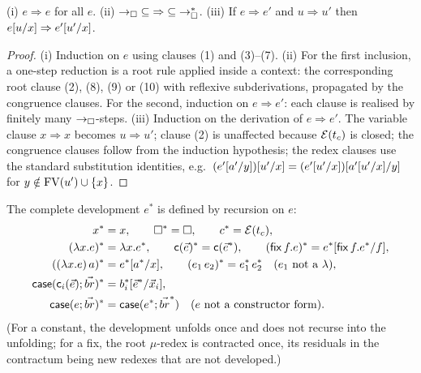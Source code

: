 \begin{lemma}
\label{lem:parred-basic}
(i) $e \Rightarrow e$ for all $e$.\quad
(ii) $\rightarrow_{\square}\; \subseteq\; \Rightarrow\; \subseteq\; \rightarrow_{\square}^{*}$.\quad
(iii) If $e \Rightarrow e'$ and $u \Rightarrow u'$ then
$e[u/x] \Rightarrow e'[u'/x]$.
\end{lemma}

\begin{proof}
(i) Induction on $e$ using clauses (1) and (3)--(7).  (ii) For the first
inclusion, a one-step reduction is a root rule applied inside a context:
the corresponding root clause (2), (8), (9) or (10) with reflexive
subderivations, propagated by the congruence clauses.  For the second,
induction on $e \Rightarrow e'$: each clause is realised by finitely
many $\rightarrow_{\square}$-steps.  (iii) Induction on the derivation of $e
\Rightarrow e'$.  The variable clause $x \Rightarrow x$ becomes $u
\Rightarrow u'$; clause (2) is unaffected because $\mathcal{E}(t_c)$ is
closed; the congruence clauses follow from the induction hypothesis;
the redex clauses use the standard substitution identities, e.g.\
$(e'[a'/y])[u'/x] =
(e'[u'/x])[a'[u'/x]/y]$ for $y \notin
\mathrm{FV}(u') \cup \{x\}$.
\end{proof}

\begin{definition}
\label{def:development}
The complete development $e^{\ast}$ is defined by recursion on $e$:
\begin{align*}
  x^{\ast} &= x, \qquad \square^{\ast} = \square, \qquad
  c^{\ast} = \mathcal{E}(t_c),\\
  (\lambda x.e)^{\ast} &= \lambda x.e^{\ast}, \qquad
  \mathsf{c}(\vec{e})^{\ast} = \mathsf{c}(\vec{e}^{\ast}), \qquad
  (\mathsf{fix}\,f.e)^{\ast} =
    e^{\ast}[\mathsf{fix}\,f.e^{\ast}/f],\\
  ((\lambda x.e)\,a)^{\ast} &= e^{\ast}[a^{\ast}/x], \qquad
  (e_1\,e_2)^{\ast} = e_1^{\ast}\,e_2^{\ast} \quad (e_1 \text{ not a }
    \lambda),\\
  \mathsf{case}(\mathsf{c}_i(\vec{e}); \vec{br})^{\ast} &=
    b_i^{\ast}[\vec{e}^{\ast}/\vec{x}_i],\\
  \mathsf{case}(e; \vec{br})^{\ast} &=
    \mathsf{case}(e^{\ast}; \vec{br}^{\ast}) \quad (e \text{ not a
    constructor form}).
\end{align*}
(For a constant, the development unfolds once and does not recurse into
the unfolding; for a fix, the root $\mu$-redex is contracted once, its
residuals in the contractum being new redexes that are not developed.)
\end{definition}

